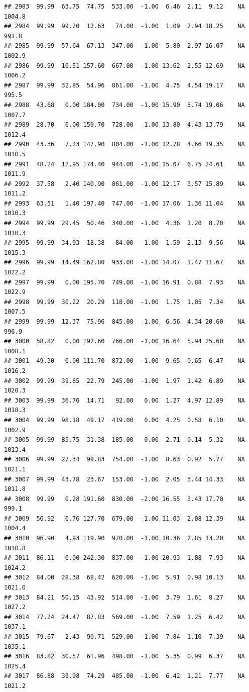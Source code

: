 \documentclass{article}\usepackage{graphicx, color}
\makeatletter
\newenvironment{kframe}{%
 \def\at@end@of@kframe{}%
 \ifinner\ifhmode%
  \def\at@end@of@kframe{\end{minipage}}%
  \begin{minipage}{\columnwidth}%
 \fi\fi%
 \def\FrameCommand##1{\hskip\@totalleftmargin \hskip-\fboxsep
 \colorbox{shadecolor}{##1}\hskip-\fboxsep
     \hskip-\linewidth \hskip-\@totalleftmargin \hskip\columnwidth}%
 \MakeFramed {\advance\hsize-\width
   \@totalleftmargin\z@ \linewidth\hsize
   \@setminipage}}%
 {\par\unskip\endMakeFramed%
 \at@end@of@kframe}
\newenvironment{knitrout}{}{} %
\makeatother
\begin{document}
\begin{knitrout}
\begin{kframe}
\begin{verbatim}
## 2983  99.99  63.75  74.75  533.00  -1.00  6.46  2.11  9.12    NA 1004.8
## 2984  99.99  99.20  12.63   74.00  -1.00  1.09  2.94 18.25    NA  991.8
## 2985  99.99  57.64  67.13  347.00  -1.00  5.80  2.97 16.07    NA 1002.9
## 2986  99.99  10.51 157.60  667.00  -1.00 13.62  2.55 12.69    NA 1006.2
## 2987  99.99  32.85  54.96  861.00  -1.00  4.75  4.54 19.17    NA  995.5
## 2988  43.68   0.00 184.00  734.00  -1.00 15.90  5.74 19.06    NA 1007.7
## 2989  28.70   0.00 159.70  728.00  -1.00 13.80  4.43 13.79    NA 1012.4
## 2990  43.36   7.23 147.90  804.00  -1.00 12.78  4.66 19.35    NA 1010.5
## 2991  48.24  12.95 174.40  944.00  -1.00 15.07  6.75 24.61    NA 1011.9
## 2992  37.58   2.40 140.90  861.00  -1.00 12.17  3.57 15.89    NA 1011.2
## 2993  63.51   1.40 197.40  747.00  -1.00 17.06  1.36 11.04    NA 1010.3
## 2994  99.99  29.45  50.46  340.00  -1.00  4.36  1.20  8.70    NA 1010.3
## 2995  99.99  34.93  18.38   84.00  -1.00  1.59  2.13  9.56    NA 1015.3
## 2996  99.99  14.49 162.80  933.00  -1.00 14.07  1.47 11.67    NA 1022.2
## 2997  99.99   0.00 195.70  749.00  -1.00 16.91  0.88  7.93    NA 1022.9
## 2998  99.99  30.22  20.29  118.00  -1.00  1.75  1.05  7.34    NA 1007.5
## 2999  99.99  12.37  75.96  845.00  -1.00  6.56  4.34 20.60    NA  996.9
## 3000  58.82   0.00 192.60  766.00  -1.00 16.64  5.94 25.60    NA 1008.1
## 3001  49.30   0.00 111.70  872.00  -1.00  9.65  0.65  6.47    NA 1016.2
## 3002  99.99  39.85  22.79  245.00  -1.00  1.97  1.42  6.89    NA 1020.3
## 3003  99.99  36.76  14.71   92.00   0.00  1.27  4.97 12.89    NA 1018.3
## 3004  99.99  98.18  49.17  419.00   0.00  4.25  0.58  6.10    NA 1002.9
## 3005  99.99  85.75  31.38  185.00   0.00  2.71  0.14  5.32    NA 1013.4
## 3006  99.99  27.34  99.83  754.00  -1.00  8.63  0.92  5.77    NA 1021.1
## 3007  99.99  43.78  23.67  153.00  -1.00  2.05  3.44 14.33    NA 1011.8
## 3008  99.99   0.28 191.60  830.00  -2.00 16.55  3.43 17.70    NA  999.1
## 3009  56.92   0.76 127.70  679.00  -1.00 11.03  2.08 12.39    NA 1004.4
## 3010  96.90   4.93 119.90  970.00  -1.00 10.36  2.85 13.20    NA 1010.8
## 3011  86.11   0.00 242.30  837.00  -1.00 20.93  1.08  7.93    NA 1024.2
## 3012  84.00  28.38  68.42  620.00  -1.00  5.91  0.98 10.13    NA 1021.0
## 3013  84.21  50.15  43.92  514.00  -1.00  3.79  1.61  8.27    NA 1027.2
## 3014  77.24  24.47  87.83  569.00  -1.00  7.59  1.25  6.42    NA 1037.1
## 3015  79.67   2.43  90.71  529.00  -1.00  7.84  1.10  7.39    NA 1035.1
## 3016  83.82  30.57  61.96  498.00  -1.00  5.35  0.99  6.37    NA 1025.4
## 3017  86.88  39.98  74.29  485.00  -1.00  6.42  1.21  7.77    NA 1021.2

\end{verbatim}
\end{kframe}
\end{knitrout}
\end{document}

